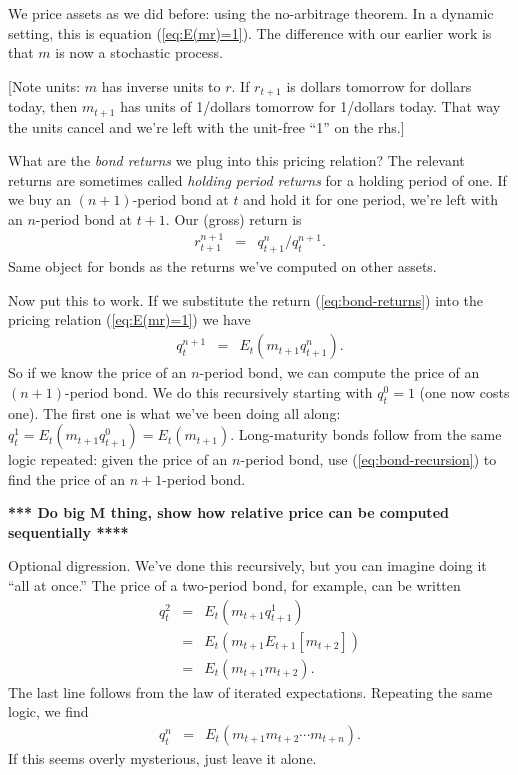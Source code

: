 \documentclass[11pt]{article}
\begin{document}
We price assets as we did before:  using the no-arbitrage theorem.
In a dynamic setting, this is equation (\ref{eq:E(mr)=1}).
The difference with our earlier work is that $m$ is now a stochastic process.

[Note units:  $m$ has inverse units to $r$.
If $r_{t+1}$ is dollars tomorrow for dollars today,
then $m_{t+1}$ has units of 1/dollars tomorrow
for 1/dollars today.
That way the units cancel and we're left with the unit-free ``1'' on the rhs.]

What are the {\it bond returns\/} we plug into this pricing relation?
The relevant returns are sometimes called {\it holding period returns\/}
for a holding period of one.
If we buy an $(n+1)$-period bond at $t$ and hold it for one period,
we're left with an $n$-period bond at $t+1$.
Our (gross) return is
\begin{eqnarray}
        r^{n+1}_{t+1} &=&  q^n_{t+1}/q^{n+1}_t .
        \label{eq:bond-returns}
\end{eqnarray}
Same object for bonds as the returns we've computed on
other assets.


Now put this to work.  If we substitute the return (\ref{eq:bond-returns})
into the pricing relation (\ref{eq:E(mr)=1}) we have
\begin{eqnarray}
    q^{n+1}_t &=& E_t \left( m_{t+1} q^n_{t+1} \right) .
    \label{eq:bond-recursion}
\end{eqnarray}
So if we know the price of an $n$-period bond,
we can compute the price of an $(n+1)$-period bond.
We do this recursively starting with $q^0_t = 1$ (one now costs one).
The first one is what we've been doing all along:
$ q^1_t = E_t (m_{t+1} q^0_{t+1}) = E_t (m_{t+1})$.
Long-maturity bonds follow from the same logic repeated:
given the price of an $n$-period bond,
use (\ref{eq:bond-recursion}) to find the price of an $n+1$-period bond.

{\bf **** Do big M thing, show how relative price can be computed sequentially ****}

Optional digression.
We've done this recursively, but you can imagine doing it ``all at once.''
The price of a two-period bond, for example, can be written
\begin{eqnarray*}
    q^{2}_t &=& E_t \left( m_{t+1} q^1_{t+1} \right) \\
            &=& E_t \left( m_{t+1} E_{t+1} [m_{t+2}] \right) \\
            &=& E_t \left( m_{t+1} m_{t+2} \right) .
\end{eqnarray*}
The last line follows from the law of iterated expectations.
Repeating the same logic, we find
\begin{eqnarray*}
    q^{n}_t  &=& E_t \left( m_{t+1} m_{t+2} \cdots m_{t+n} \right) .
\end{eqnarray*}
If this seems overly mysterious, just leave it alone.
\end{document}
